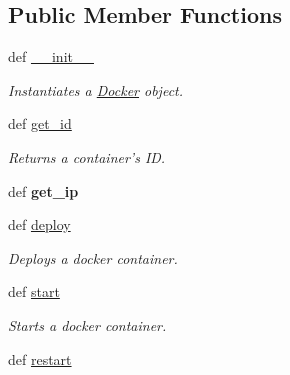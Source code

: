 \subsection*{Public Member Functions}
\begin{DoxyCompactItemize}
\item 
def \hyperlink{classhypervisor_1_1docker__driver_1_1Docker_a95faee6439e35695f424c61763b4077e}{\-\_\-\-\_\-init\-\_\-\-\_\-}
\begin{DoxyCompactList}\small\item\em Instantiates a \hyperlink{classhypervisor_1_1docker__driver_1_1Docker}{Docker} object. \end{DoxyCompactList}\item 
def \hyperlink{classhypervisor_1_1docker__driver_1_1Docker_aa6d1c57b5e6eb40c234af79445d5ccaa}{get\-\_\-id}
\begin{DoxyCompactList}\small\item\em Returns a container's I\-D. \end{DoxyCompactList}\item 
\hypertarget{classhypervisor_1_1docker__driver_1_1Docker_aaecff717c2e84fd0b8bf735e5f9a1f70}{def {\bfseries get\-\_\-ip}}\label{classhypervisor_1_1docker__driver_1_1Docker_aaecff717c2e84fd0b8bf735e5f9a1f70}

\item 
def \hyperlink{classhypervisor_1_1docker__driver_1_1Docker_ab7550e8839169bb0c1ba08050709f1a7}{deploy}
\begin{DoxyCompactList}\small\item\em Deploys a docker container. \end{DoxyCompactList}\item 
\hypertarget{classhypervisor_1_1docker__driver_1_1Docker_ae22fe7316ede6ff4986ec8c911602e61}{def \hyperlink{classhypervisor_1_1docker__driver_1_1Docker_ae22fe7316ede6ff4986ec8c911602e61}{start}}\label{classhypervisor_1_1docker__driver_1_1Docker_ae22fe7316ede6ff4986ec8c911602e61}

\begin{DoxyCompactList}\small\item\em Starts a docker container. \end{DoxyCompactList}\item 
\hypertarget{classhypervisor_1_1docker__driver_1_1Docker_a9455c971d4a2824d7ef8b0786b2d754b}{def \hyperlink{classhypervisor_1_1docker__driver_1_1Docker_a9455c971d4a2824d7ef8b0786b2d754b}{restart}}\label{classhypervisor_1_1docker__driver_1_1Docker_a9455c971d4a2824d7ef8b0786b2d754b}


\end{DoxyCompactItemize}
